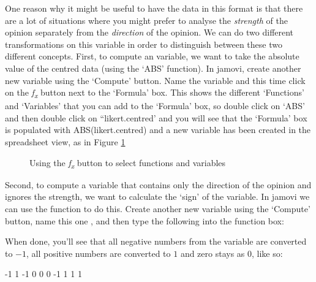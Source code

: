 One reason why it might be useful to have the data in this format is that there are a lot of situations where you might prefer to analyse the {\it strength} of the opinion separately from the {\it direction} of the opinion. We can do two different transformations on this  variable in order to distinguish between these two different concepts. First, to compute an  variable, we want to take the absolute value of the centred data (using the `ABS' function). In jamovi, create another new variable using the `Compute' button. Name the variable  and this time click on the {\it f\textsubscript{x}} button next to the `Formula' box. This shows the different `Functions' and `Variables' that you can add to the `Formula' box, so double click on `ABS' and then double click on ``likert.centred' and you will see that the `Formula' box is populated with ABS(likert.centred) and a new variable has been created in the spreadsheet view, as in Figure \ref{fig:opinionstrength}

\bigskip
\begin{figure}[!htb]
\begin{center}
\caption{Using the {\it f\textsubscript{x}} button to select functions and variables}
\label{fig:opinionstrength}
\HR
\end{center}
\end{figure}
\bigskip

\noindent
Second, to compute a variable that contains only the direction of the opinion and ignores the strength, we want to calculate the `sign' of the variable. In jamovi we can use the  function to do this. Create another new variable using the `Compute' button, name this one , and then type the following into the function box: 


When done, you'll see that all negative numbers from the  variable are converted to $-1$, all positive numbers are converted to $1$ and zero stays as $0$, like so: 

\begin{rblock1}
-1  1 -1  0  0  0 -1  1  1  1
\end{rblock1}

